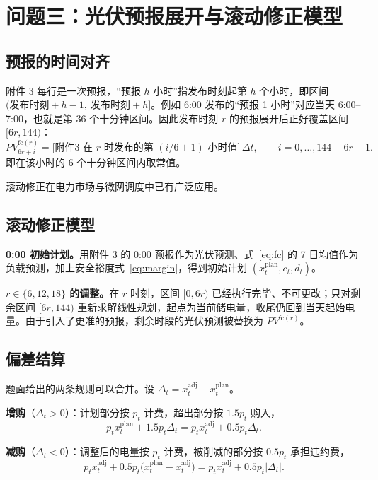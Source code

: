 \section{问题三：光伏预报展开与滚动修正模型}

\subsection{预报的时间对齐}

附件 3 每行是一次预报，“预报 $h$ 小时”指发布时刻起第 $h$ 个小时，即区间 $(\text{发布时刻}+h-1,\ \text{发布时刻}+h]$。例如 6:00 发布的“预报 1 小时”对应当天 6:00--7:00，也就是第 36 个十分钟区间。因此发布时刻 $r$ 的预报展开后正好覆盖区间 $[6r,144)$：
\begin{equation}
PV^{\mathrm{fc}(r)}_{6r+i}=\bigl[\text{附件3 在 }r\text{ 时发布的第 }(i/6+1)\text{ 小时值}\bigr]\,\Delta t,
\qquad i=0,\dots,144-6r-1 .
\label{eq:p3expand}
\end{equation}
即在该小时的 6 个十分钟区间内取常值。

滚动修正在电力市场与微网调度中已有广泛应用\cite{morales2014,wang2020}。

\subsection{滚动修正模型}

\textbf{0:00 初始计划。}用附件 3 的 0:00 预报作为光伏预测、式~\eqref{eq:fc} 的 7 日均值作为负载预测，加上安全裕度式~\eqref{eq:margin}，得到初始计划 $(x^{\text{plan}}_t,c_t,d_t)$。

\textbf{$r\in\{6,12,18\}$ 的调整。}在 $r$ 时刻，区间 $[0,6r)$ 已经执行完毕、不可更改；只对剩余区间 $[6r,144)$ 重新求解线性规划，起点为当前储电量，收尾仍回到当天起始电量。由于引入了更准的预报，剩余时段的光伏预测被替换为 $PV^{\mathrm{fc}(r)}$。

\subsection{偏差结算}

题面给出的两条规则可以合并。设 $\Delta_t=x_t^{\text{adj}}-x_t^{\text{plan}}$。

\textbf{增购}（$\Delta_t>0$）：计划部分按 $p_t$ 计费，超出部分按 $1.5p_t$ 购入，
\begin{equation}
p_tx^{\text{plan}}_t+1.5p_t\Delta_t=p_tx^{\text{adj}}_t+0.5p_t\Delta_t .
\end{equation}

\textbf{减购}（$\Delta_t<0$）：调整后的电量按 $p_t$ 计费，被削减的部分按 $0.5p_t$ 承担违约费，
\begin{equation}
p_tx^{\text{adj}}_t+0.5p_t\bigl(x^{\text{plan}}_t-x^{\text{adj}}_t\bigr)
=p_tx^{\text{adj}}_t+0.5p_t|\Delta_t| .
\end{equation}

